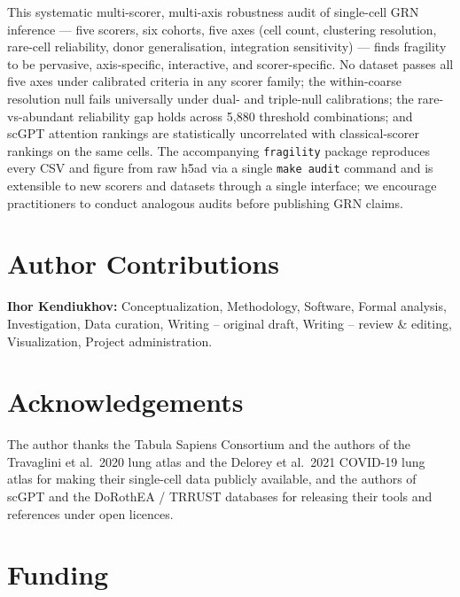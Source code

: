\documentclass[unnumsec,webpdf,contemporary,large,namedate]{oup-authoring-template}
\begin{document}
This systematic multi-scorer, multi-axis robustness audit of
single-cell GRN inference --- five scorers, six cohorts, five axes
(cell count, clustering resolution, rare-cell reliability, donor
generalisation, integration sensitivity) --- finds fragility to be
pervasive, axis-specific, interactive, and scorer-specific. No dataset
passes all five axes under calibrated criteria in any scorer family;
the within-coarse resolution null fails universally under dual- and
triple-null calibrations; the rare-vs-abundant reliability gap holds
across 5{,}880 threshold combinations; and scGPT attention rankings
are statistically uncorrelated with classical-scorer rankings on the
same cells. The accompanying \texttt{fragility} package reproduces
every CSV and figure from raw h5ad via a single \texttt{make audit}
command and is extensible to new scorers and datasets through a single
interface; we encourage practitioners to conduct analogous audits
before publishing GRN claims.

\section*{Author Contributions}

\textbf{Ihor Kendiukhov:} Conceptualization, Methodology, Software,
Formal analysis, Investigation, Data curation, Writing -- original
draft, Writing -- review \& editing, Visualization, Project administration.

\section*{Acknowledgements}

The author thanks the Tabula Sapiens Consortium and the authors of
the Travaglini et al.\ 2020 lung atlas and the Delorey et al.\ 2021
COVID-19 lung atlas for making their single-cell data publicly
available, and the authors of scGPT and the DoRothEA / TRRUST
databases for releasing their tools and references under open
licences.

\section*{Funding}
\end{document}
